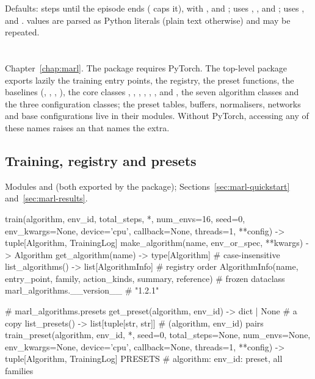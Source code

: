 Defaults:  steps until the episode ends ( caps it),
with ,  and ;
 uses , ,
 and ;  uses
,  and .
 values are parsed as Python literals (plain text otherwise) and
may be repeated.

\section{\texorpdfstring{}{marl\_algorithms}}\label{sec:api-marl}

Chapter~\ref{chap:marl}. The package requires PyTorch. The top-level package
exports lazily the training entry points, the registry, the preset functions,
the baselines (, , ,
), the core classes , ,
, , ,
,  and , the seven
algorithm classes and the three configuration classes; the preset tables,
buffers, normalisers, networks and base configurations live in their modules.
Without PyTorch, accessing any of these names raises an 
that names the  extra.

\subsection{Training, registry and presets}

Modules  and 
(both exported by the package);
Sections~\ref{sec:marl-quickstart} and~\ref{sec:marl-results}.

\begin{pycode}
train(algorithm, env_id, total_steps, *, num_envs=16, seed=0,
      env_kwargs=None, device='cpu', callback=None, threads=1,
      **config) -> tuple[Algorithm, TrainingLog]
make_algorithm(name, env_or_spec, **kwargs) -> Algorithm
get_algorithm(name) -> type[Algorithm]      # case-insensitive
list_algorithms() -> list[AlgorithmInfo]    # registry order
AlgorithmInfo(name, entry_point, family, action_kinds, summary,
              reference)                    # frozen dataclass
marl_algorithms.__version__                 # "1.2.1"

# marl_algorithms.presets
get_preset(algorithm, env_id) -> dict | None     # a copy
list_presets() -> list[tuple[str, str]]          # (algorithm, env_id) pairs
train_preset(algorithm, env_id, *, seed=0, total_steps=None, num_envs=None,
             env_kwargs=None, device='cpu', callback=None, threads=1,
             **config) -> tuple[Algorithm, TrainingLog]
PRESETS                   # {algorithm: {env_id: preset}}, all families
\end{pycode}

